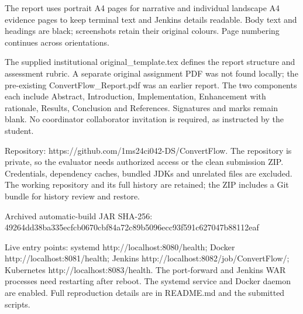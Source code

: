 \documentclass[12pt,a4paper]{article}
\begin{document}
The report uses portrait A4 pages for narrative and individual landscape A4 evidence pages to keep terminal text and Jenkins details readable. Body text and headings are black; screenshots retain their original colours. Page numbering continues across orientations.

The supplied institutional original\_template.tex defines the report structure and assessment rubric. A separate original assignment PDF was not found locally; the pre-existing ConvertFlow\_Report.pdf was an earlier report. The two components each include Abstract, Introduction, Implementation, Enhancement with rationale, Results, Conclusion and References. Signatures and marks remain blank. No coordinator collaborator invitation is required, as instructed by the student.

Repository: https://github.com/1ms24ci042-DS/ConvertFlow. The repository is private, so the evaluator needs authorized access or the clean submission ZIP. Credentials, dependency caches, bundled JDKs and unrelated files are excluded. The working repository and its full history are retained; the ZIP includes a Git bundle for history review and restore.

Archived automatic-build JAR SHA-256: 49264dd38ba335ecfcb0670cbf84a72c89b5096ecc93f591c627047b88112eaf

Live entry points: systemd http://localhost:8080/health; Docker http://localhost:8081/health; Jenkins http://localhost:8082/job/ConvertFlow/; Kubernetes http://localhost:8083/health. The port-forward and Jenkins WAR processes need restarting after reboot. The systemd service and Docker daemon are enabled. Full reproduction details are in README.md and the submitted scripts.
\end{document}
